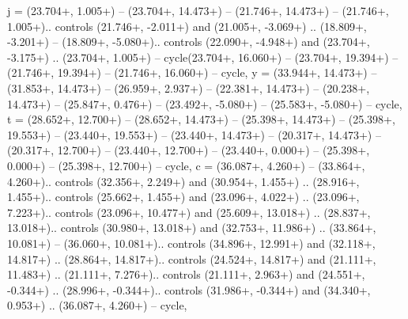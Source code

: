 {j} = {(23.704+\ctpXshift, 1.005+\ctpYshift) -- (23.704+\ctpXshift, 14.473+\ctpYshift) -- (21.746+\ctpXshift, 14.473+\ctpYshift) -- (21.746+\ctpXshift, 1.005+\ctpYshift).. controls (21.746+\ctpXshift, -2.011+\ctpYshift) and (21.005+\ctpXshift, -3.069+\ctpYshift) .. (18.809+\ctpXshift, -3.201+\ctpYshift) -- (18.809+\ctpXshift, -5.080+\ctpYshift).. controls (22.090+\ctpXshift, -4.948+\ctpYshift) and (23.704+\ctpXshift, -3.175+\ctpYshift) .. (23.704+\ctpXshift, 1.005+\ctpYshift) -- cycle(23.704+\ctpXshift, 16.060+\ctpYshift) -- (23.704+\ctpXshift, 19.394+\ctpYshift) -- (21.746+\ctpXshift, 19.394+\ctpYshift) -- (21.746+\ctpXshift, 16.060+\ctpYshift) -- cycle},
{y} = {(33.944+\ctpXshift, 14.473+\ctpYshift) -- (31.853+\ctpXshift, 14.473+\ctpYshift) -- (26.959+\ctpXshift, 2.937+\ctpYshift) -- (22.381+\ctpXshift, 14.473+\ctpYshift) -- (20.238+\ctpXshift, 14.473+\ctpYshift) -- (25.847+\ctpXshift, 0.476+\ctpYshift) -- (23.492+\ctpXshift, -5.080+\ctpYshift) -- (25.583+\ctpXshift, -5.080+\ctpYshift) -- cycle},
{t} = {(28.652+\ctpXshift, 12.700+\ctpYshift) -- (28.652+\ctpXshift, 14.473+\ctpYshift) -- (25.398+\ctpXshift, 14.473+\ctpYshift) -- (25.398+\ctpXshift, 19.553+\ctpYshift) -- (23.440+\ctpXshift, 19.553+\ctpYshift) -- (23.440+\ctpXshift, 14.473+\ctpYshift) -- (20.317+\ctpXshift, 14.473+\ctpYshift) -- (20.317+\ctpXshift, 12.700+\ctpYshift) -- (23.440+\ctpXshift, 12.700+\ctpYshift) -- (23.440+\ctpXshift, 0.000+\ctpYshift) -- (25.398+\ctpXshift, 0.000+\ctpYshift) -- (25.398+\ctpXshift, 12.700+\ctpYshift) -- cycle},
{c} = {(36.087+\ctpXshift, 4.260+\ctpYshift) -- (33.864+\ctpXshift, 4.260+\ctpYshift).. controls (32.356+\ctpXshift, 2.249+\ctpYshift) and (30.954+\ctpXshift, 1.455+\ctpYshift) .. (28.916+\ctpXshift, 1.455+\ctpYshift).. controls (25.662+\ctpXshift, 1.455+\ctpYshift) and (23.096+\ctpXshift, 4.022+\ctpYshift) .. (23.096+\ctpXshift, 7.223+\ctpYshift).. controls (23.096+\ctpXshift, 10.477+\ctpYshift) and (25.609+\ctpXshift, 13.018+\ctpYshift) .. (28.837+\ctpXshift, 13.018+\ctpYshift).. controls (30.980+\ctpXshift, 13.018+\ctpYshift) and (32.753+\ctpXshift, 11.986+\ctpYshift) .. (33.864+\ctpXshift, 10.081+\ctpYshift) -- (36.060+\ctpXshift, 10.081+\ctpYshift).. controls (34.896+\ctpXshift, 12.991+\ctpYshift) and (32.118+\ctpXshift, 14.817+\ctpYshift) .. (28.864+\ctpXshift, 14.817+\ctpYshift).. controls (24.524+\ctpXshift, 14.817+\ctpYshift) and (21.111+\ctpXshift, 11.483+\ctpYshift) .. (21.111+\ctpXshift, 7.276+\ctpYshift).. controls (21.111+\ctpXshift, 2.963+\ctpYshift) and (24.551+\ctpXshift, -0.344+\ctpYshift) .. (28.996+\ctpXshift, -0.344+\ctpYshift).. controls (31.986+\ctpXshift, -0.344+\ctpYshift) and (34.340+\ctpXshift, 0.953+\ctpYshift) .. (36.087+\ctpXshift, 4.260+\ctpYshift) -- cycle},

